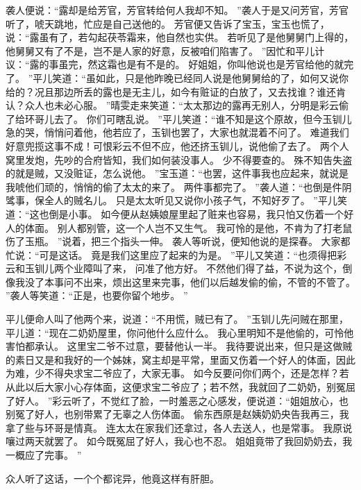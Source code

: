 袭人便说：“露却是给芳官，芳官转给何人我却不知。
”袭人于是又问芳官，芳官听了，唬天跳地，忙应是自己送他的。
芳官便又告诉了宝玉，宝玉也慌了，说：“露虽有了，若勾起茯苓霜来，他自然也实供。
若听见了是他舅舅门上得的，他舅舅又有了不是，岂不是人家的好意，反被咱们陷害了。
”因忙和平儿计议：“露的事虽完，然这霜也是有不是的。
好姐姐，你叫他说也是芳官给他的就完了。
”平儿笑道：“虽如此，只是他昨晚已经同人说是他舅舅给的了，如何又说你给的？况且那边所丢的露也是无主儿，如今有赃证的白放了，又去找谁？谁还肯认？众人也未必心服。
”晴雯走来笑道：“太太那边的露再无别人，分明是彩云偷了给环哥儿去了。
你们可瞎乱说。
”平儿笑道：“谁不知是这个原故，但今玉钏儿急的哭，悄悄问着他，他若应了，玉钏也罢了，大家也就混着不问了。
难道我们好意兜揽这事不成！可恨彩云不但不应，他还挤玉钏儿，说他偷了去了。
两个人窝里发炮，先吵的合府皆知，我们如何装没事人。
少不得要查的。
殊不知告失盗的就是贼，又没赃证，怎么说他。
”宝玉道：“也罢，这件事我也应起来，就说是我唬他们顽的，悄悄的偷了太太的来了。
两件事都完了。
”袭人道：“也倒是件阴骘事，保全人的贼名儿。
只是太太听见又说你小孩子气，不知好歹了。
”平儿笑道：“这也倒是小事。
如今便从赵姨娘屋里起了赃来也容易，我只怕又伤着一个好人的体面。
别人都别管，这一个人岂不又生气。
我可怜的是他，不肯为了打老鼠伤了玉瓶。
”说着，把三个指头一伸。
袭人等听说，便知他说的是探春。
大家都忙说：“可是这话。
竟是我们这里应了起来的为是。
”平儿又笑道：“也须得把彩云和玉钏儿两个业障叫了来，
问准了他方好。
不然他们得了益，不说为这个，倒像我没了本事问不出来，烦出这里来完事，他们以后越发偷的偷，不管的不管了。
”袭人等笑道：“正是，也要你留个地步。
”
\par
平儿便命人叫了他两个来，说道：“不用慌，贼已有了。
”玉钏儿先问贼在那里，平儿道：“现在二奶奶屋里，你问他什么应什么。
我心里明知不是他偷的，可怜他害怕都承认。
这里宝二爷不过意，要替他认一半。
我待要说出来，但只是这做贼的素日又是和我好的一个姊妹，窝主却是平常，里面又伤着一个好人的体面，因此为难，少不得央求宝二爷应了，大家无事。
如今反要问你们两个，还是怎样？若从此以后大家小心存体面，这便求宝二爷应了；若不然，我就回了二奶奶，别冤屈了好人。
”彩云听了，不觉红了脸，一时羞恶之心感发，便说道：“姐姐放心，也别冤了好人，也别带累了无辜之人伤体面。
偷东西原是赵姨奶奶央告我再三，我拿了些与环哥是情真。
连太太在家我们还拿过，各人去送人，也是常事。
我原说嚷过两天就罢了。
如今既冤屈了好人，我心也不忍。
姐姐竟带了我回奶奶去，我一概应了完事。
”\par
众人听了这话，一个个都诧异，他竟这样有肝胆。
